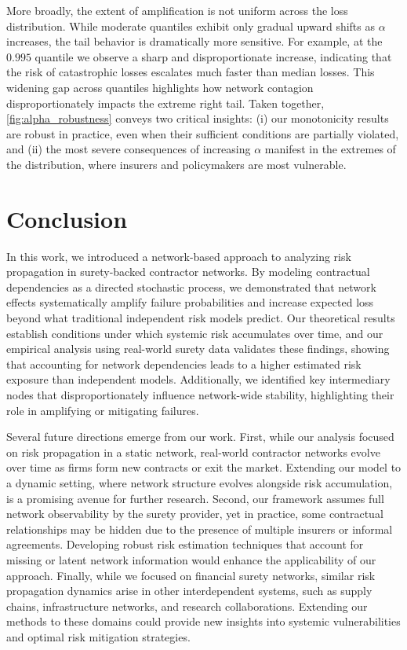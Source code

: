 \documentclass[mnsc,nonblindrev]{informs3}
\begin{document}
More broadly, the extent of amplification is not uniform across the loss distribution. While moderate quantiles exhibit only gradual upward shifts as $\alpha$ increases, the tail behavior is dramatically more sensitive. For example, at the $0.995$ quantile we observe a sharp and disproportionate increase, indicating that the risk of catastrophic losses escalates much faster than median losses. This widening gap across quantiles highlights how network contagion disproportionately impacts the extreme right tail. Taken together, \cref{fig:alpha_robustness} conveys two critical insights: (i) our monotonicity results are robust in practice, even when their sufficient conditions are partially violated, and (ii) the most severe consequences of increasing $\alpha$ manifest in the extremes of the distribution, where insurers and policymakers are most vulnerable.


\section{Conclusion}
\label{sec:conclusion}

In this work, we introduced a network-based approach to analyzing risk propagation in surety-backed contractor networks. By modeling contractual dependencies as a directed stochastic process, we demonstrated that network effects systematically amplify failure probabilities and increase expected loss beyond what traditional independent risk models predict. Our theoretical results establish conditions under which systemic risk accumulates over time, and our empirical analysis using real-world surety data validates these findings, showing that accounting for network dependencies leads to a higher estimated risk exposure than independent models. Additionally, we identified key intermediary nodes that disproportionately influence network-wide stability, highlighting their role in amplifying or mitigating failures.

Several future directions emerge from our work. First, while our analysis focused on risk propagation in a static network, real-world contractor networks evolve over time as firms form new contracts or exit the market. Extending our model to a dynamic setting, where network structure evolves alongside risk accumulation, is a promising avenue for further research. Second, our framework assumes full network observability by the surety provider, yet in practice, some contractual relationships may be hidden due to the presence of multiple insurers or informal agreements. Developing robust risk estimation techniques that account for missing or latent network information would enhance the applicability of our approach. Finally, while we focused on financial surety networks, similar risk propagation dynamics arise in other interdependent systems, such as supply chains, infrastructure networks, and research collaborations. Extending our methods to these domains could provide new insights into systemic vulnerabilities and optimal risk mitigation strategies.
\end{document}
